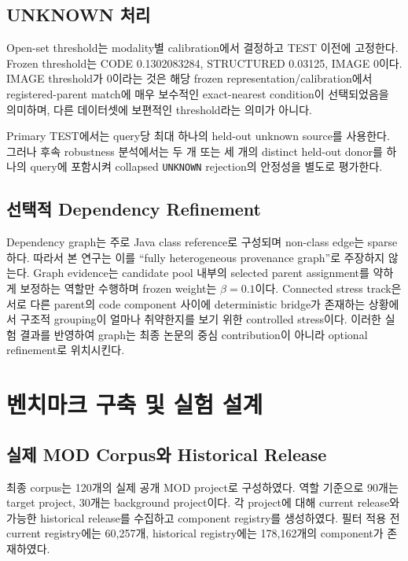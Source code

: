 \documentclass[runningheads]{llncs}
\begin{document}
\subsection{UNKNOWN 처리}

Open-set threshold는 modality별 calibration에서 결정하고 TEST 이전에 고정한다. Frozen threshold는 CODE 0.1302083284, STRUCTURED 0.03125, IMAGE 0이다. IMAGE threshold가 0이라는 것은 해당 frozen representation/calibration에서 registered-parent match에 매우 보수적인 exact-nearest condition이 선택되었음을 의미하며, 다른 데이터셋에 보편적인 threshold라는 의미가 아니다.

Primary TEST에서는 query당 최대 하나의 held-out unknown source를 사용한다. 그러나 후속 robustness 분석에서는 두 개 또는 세 개의 distinct held-out donor를 하나의 query에 포함시켜 collapsed \texttt{UNKNOWN} rejection의 안정성을 별도로 평가한다.

\subsection{선택적 Dependency Refinement}

Dependency graph는 주로 Java class reference로 구성되며 non-class edge는 sparse하다. 따라서 본 연구는 이를 ``fully heterogeneous provenance graph''로 주장하지 않는다. Graph evidence는 candidate pool 내부의 selected parent assignment를 약하게 보정하는 역할만 수행하며 frozen weight는 \(\beta=0.1\)이다. Connected stress track은 서로 다른 parent의 code component 사이에 deterministic bridge가 존재하는 상황에서 구조적 grouping이 얼마나 취약한지를 보기 위한 controlled stress이다. 이러한 실험 결과를 반영하여 graph는 최종 논문의 중심 contribution이 아니라 optional refinement로 위치시킨다.


\section{벤치마크 구축 및 실험 설계}

\subsection{실제 MOD Corpus와 Historical Release}

최종 corpus는 120개의 실제 공개 MOD project로 구성하였다. 역할 기준으로 90개는 target project, 30개는 background project이다. 각 project에 대해 current release와 가능한 historical release를 수집하고 component registry를 생성하였다. 필터 적용 전 current registry에는 60,257개, historical registry에는 178,162개의 component가 존재하였다.
\end{document}

